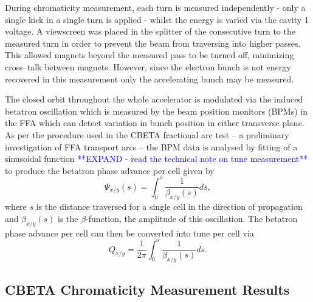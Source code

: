 \documentclass[../main.tex]{subfiles}
\begin{document}
During chromaticity measurement, each turn is measured independently - only a single kick in a single turn is applied - whilst the energy is varied via the cavity 1 voltage. A viewscreen was placed in the splitter of the consecutive turn to the measured turn in order to prevent the beam from traversing into higher passes. This allowed magnets beyond the measured pass to be turned off, minimizing cross--talk between magnets. However, since the electron bunch is not energy recovered in this measurement only the accelerating bunch may be measured.    

The closed orbit throughout the whole accelerator is modulated via the induced betatron oscillation which is measured by the beam position monitors (BPMs) in the FFA which can detect variation in bunch position in either transverse plane. As per the procedure used in the CBETA fractional arc test \cite{gulliford2019beam} -- a preliminary investigation of FFA transport arcs -- the BPM data is analysed by fitting of a sinusoidal function \textcolor{blue}{**EXPAND - read the technical note on tune measurement**} to produce the betatron phase advance per cell given by
\begin{equation}
\Psi_{x/y}\left(s\right) = \int_{0}^{s}\frac{1}{\beta_{x/y}\left(s\right)}ds,
\label{eq:betatron_phase_advance_per_cell}
\end{equation}
where $s$ is the distance traversed for a single cell in the direction of propagation and $\beta_{x/y}\left(s\right)$ is the $\beta$-function, the amplitude of this oscillation. The betatron phase advance per cell can then be converted into tune per cell via 
\begin{equation}
Q_{x/y} = \frac{1}{2\pi}\int_{0}^{s} \frac{1}{\beta_{x/y}\left(s\right)}ds.
\label{eq:tune_definition}
\end{equation}

\subsection{CBETA Chromaticity Measurement Results}
\label{sec:CBETA_chromaticity_measurement_results}
\end{document}
